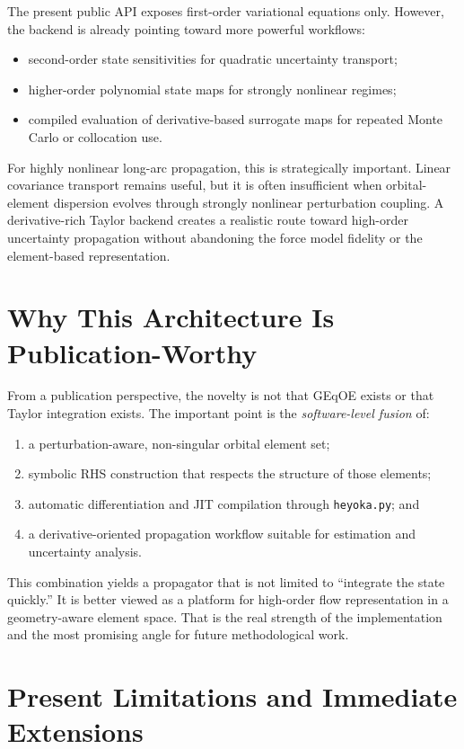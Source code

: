 \documentclass[11pt]{article}
\begin{document}
The present public API exposes first-order variational equations only. However,
the backend is already pointing toward more powerful workflows:
\begin{itemize}
    \item second-order state sensitivities for quadratic uncertainty transport;
    \item higher-order polynomial state maps for strongly nonlinear regimes;
    \item compiled evaluation of derivative-based surrogate maps for repeated
    Monte Carlo or collocation use.
\end{itemize}

For highly nonlinear long-arc propagation, this is strategically important.
Linear covariance transport remains useful, but it is often insufficient when
orbital-element dispersion evolves through strongly nonlinear perturbation
coupling. A derivative-rich Taylor backend creates a realistic route toward
high-order uncertainty propagation without abandoning the force model fidelity
or the element-based representation.

\section{Why This Architecture Is Publication-Worthy}

From a publication perspective, the novelty is not that GEqOE exists or that
Taylor integration exists. The important point is the \emph{software-level
fusion} of:
\begin{enumerate}
    \item a perturbation-aware, non-singular orbital element set;
    \item symbolic RHS construction that respects the structure of those
    elements;
    \item automatic differentiation and JIT compilation through
    \texttt{heyoka.py}; and
    \item a derivative-oriented propagation workflow suitable for estimation and
    uncertainty analysis.
\end{enumerate}

This combination yields a propagator that is not limited to ``integrate the
state quickly.'' It is better viewed as a platform for high-order flow
representation in a geometry-aware element space. That is the real strength of
the implementation and the most promising angle for future methodological work.

\section{Present Limitations and Immediate Extensions}
\end{document}

